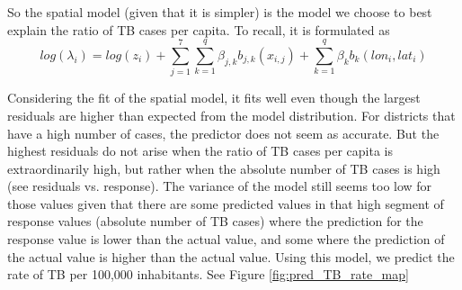 So the spatial model (given that it is simpler) is the model we choose to best explain the ratio of TB cases per capita. To recall, it is formulated as 
$$
log(\lambda_i) = log(z_i) +  \sum_{j=1}^{7}\sum_{k=1}^{q}\beta_{j,k}b_{j,k}(x_{i,j}) + \sum_{k=1}^{q}\beta_{k}b_{k}(lon_i , lat_i) 
$$


Considering the fit of the spatial model, it fits well even though the largest residuals are higher
than expected from the model distribution. For districts that have a high number of cases, the predictor does
not seem as accurate. But the highest residuals do not arise when the ratio of TB cases per capita
is extraordinarily high, but rather when the absolute number of TB cases is high (see residuals vs. response).
The variance of the model still seems too low for those values given that there are some predicted values in
that high segment of response values (absolute number of TB cases) where the prediction for the response
value is lower than the actual value, and some where the prediction of the actual value is higher than the
actual value.
Using this model, we predict the rate of TB per 100,000 inhabitants. See Figure \ref{fig:pred_TB_rate_map}

